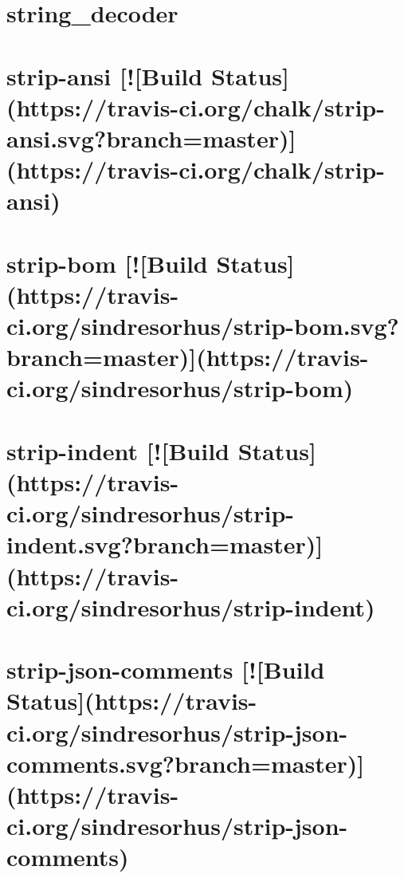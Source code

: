 \documentclass[twoside]{book}
\newcommand{\+}{\discretionary{\mbox{\scriptsize$\hookleftarrow$}}{}{}}
\begin{document}
\chapter{string\+\_\+decoder}
\label{md_dsmacc_examples_DRmerge_node_modules_string_decoder_README}

\chapter{strip-\/ansi \mbox{[}!\mbox{[}Build Status\mbox{]}(https\+://travis-\/ci.org/chalk/strip-\/ansi.svg?branch=master)\mbox{]}(https\+://travis-\/ci.org/chalk/strip-\/ansi)}
\label{md_dsmacc_examples_DRmerge_node_modules_strip-ansi_readme}

\chapter{strip-\/bom \mbox{[}!\mbox{[}Build Status\mbox{]}(https\+://travis-\/ci.org/sindresorhus/strip-\/bom.svg?branch=master)\mbox{]}(https\+://travis-\/ci.org/sindresorhus/strip-\/bom)}
\label{md_dsmacc_examples_DRmerge_node_modules_strip-bom_readme}

\chapter{strip-\/indent \mbox{[}!\mbox{[}Build Status\mbox{]}(https\+://travis-\/ci.org/sindresorhus/strip-\/indent.svg?branch=master)\mbox{]}(https\+://travis-\/ci.org/sindresorhus/strip-\/indent)}
\label{md_dsmacc_examples_DRmerge_node_modules_strip-indent_readme}

\chapter{strip-\/json-\/comments \mbox{[}!\mbox{[}Build Status\mbox{]}(https\+://travis-\/ci.org/sindresorhus/strip-\/json-\/comments.svg?branch=master)\mbox{]}(https\+://travis-\/ci.org/sindresorhus/strip-\/json-\/comments)}
\label{md_dsmacc_examples_DRmerge_node_modules_strip-json-comments_readme}

\end{document}
